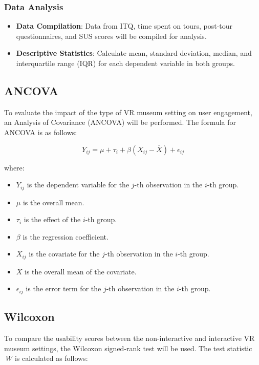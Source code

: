 \documentclass[conference]{IEEEtran}
\begin{document}
\subsubsection{Data Analysis}
\begin{itemize}
    \item \textbf{Data Compilation}: Data from ITQ, time spent on tours, post-tour questionnaires, and SUS scores will be compiled for analysis.
    \item \textbf{Descriptive Statistics}: Calculate mean, standard deviation, median, and interquartile range (IQR) for each dependent variable in both groups.
\end{itemize}
\subsection{ANCOVA}

To evaluate the impact of the type of VR museum setting on user engagement, an Analysis of Covariance (ANCOVA) will be performed. The formula for ANCOVA is as follows:

\[ Y_{ij} = \mu + \tau_i + \beta(X_{ij} - \overline{X}) + \epsilon_{ij} \]

where:
\begin{itemize}
    \item \( Y_{ij} \) is the dependent variable for the \( j \)-th observation in the \( i \)-th group.
    \item \( \mu \) is the overall mean.
    \item \( \tau_i \) is the effect of the \( i \)-th group.
    \item \( \beta \) is the regression coefficient.
    \item \( X_{ij} \) is the covariate for the \( j \)-th observation in the \( i \)-th group.
    \item \( \overline{X} \) is the overall mean of the covariate.
    \item \( \epsilon_{ij} \) is the error term for the \( j \)-th observation in the \( i \)-th group.
\end{itemize}

\subsection{Wilcoxon}
To compare the usability scores between the non-interactive and interactive VR museum settings, the Wilcoxon signed-rank test will be used. The test statistic \( \ W \) is calculated as follows:
\end{document}
